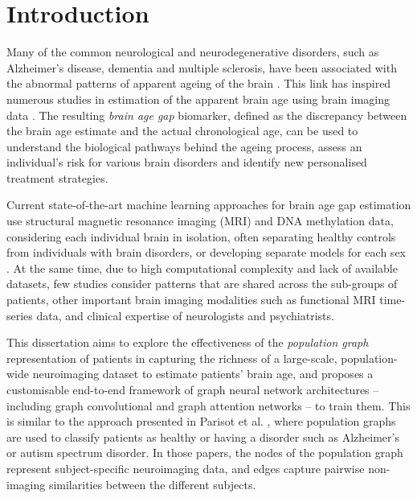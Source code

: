 \chapter{Introduction}



Many of the common neurological and neurodegenerative disorders, such as Alzheimer’s disease, dementia and multiple sclerosis, have been associated with the abnormal patterns of apparent ageing of the brain \cite{kaufmann2019}. This link has inspired numerous studies in estimation of the apparent brain age using brain imaging data \cite{franke2019ten}. The resulting \textit{brain age gap} biomarker, defined as the discrepancy between the brain age estimate and the actual chronological age, can be used to understand the biological pathways behind the ageing process, assess an individual’s risk for various brain disorders and identify new personalised treatment strategies.

Current state-of-the-art machine learning approaches for brain age gap estimation use structural magnetic resonance imaging (MRI) and DNA methylation data, considering each individual brain in isolation, often separating healthy controls from individuals with brain disorders, or developing separate models for each sex \cite{kaufmann2019,niu2019improved}. At the same time, due to high computational complexity and lack of available datasets, few studies consider patterns that are shared across the sub-groups of patients, other important brain imaging modalities such as functional MRI time-series data, and clinical expertise of neurologists and psychiatrists.

This dissertation aims to explore the effectiveness of the \textit{population graph} representation of patients in capturing the richness of a large-scale, population-wide neuroimaging dataset to estimate patients' brain age, and proposes a customisable end-to-end framework of graph neural network architectures – including graph convolutional \cite{kipf2017semi} and graph attention \cite{velickovic2018graph} networks – to train them. This is similar to the approach presented in Parisot et al. \cite{parisot2017spectral,parisot2018disease}, where population graphs are used to classify patients as healthy or having a disorder such as Alzheimer's or autism spectrum disorder. In those papers, the nodes of the population graph represent subject-specific neuroimaging data, and edges capture pairwise non-imaging similarities between the different subjects. 

